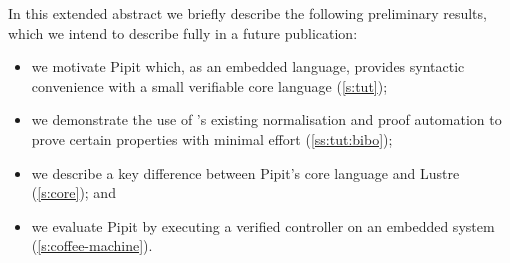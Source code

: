 \documentclass[sigplan,screen, review]{acmart}
\begin{document}
In this extended abstract we briefly describe the following preliminary results, which we intend to describe fully in a future publication:

\begin{itemize}
  \item we motivate Pipit which, as an embedded language, provides syntactic convenience with a small verifiable core language (\autoref{s:tut});
  \item we demonstrate the use of \fstar{}'s existing normalisation and proof automation to prove certain properties with minimal effort (\autoref{ss:tut:bibo});
  \item we describe a key difference between Pipit's core language and Lustre (\autoref{s:core}); and
  \item we evaluate Pipit by executing a verified controller on an embedded system (\autoref{s:coffee-machine}).
\end{itemize}



\end{document}
